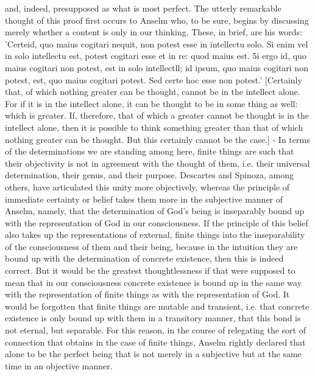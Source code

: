     and, indeed, presupposed as what is most perfect. The utterly
    remarkable thought of this proof first occurs to Anselm who, to be
    sure, begins by discussing merely whether a content is only in our
    thinking. These, in brief, are his words: 'Certeid, quo maius cogitari
    nequit, non potest esse in intellectu solo. Si enim vel in solo
    intellectu est, potest cogitari esse et in re: quod maius est. 5i ergo id,
    quo maius cogitari non potest, est in solo intellectll; id ipsum, quo
    maius cogitari non potest, est, quo maius cogitari potest. Sed certe
    hoc esse non potest.' [Certainly that, of which nothing greater can
    be thought, cannot be in the intellect alone. For if it is in the
    intellect alone, it can be thought to be in some thing as well: which
    is greater. If, therefore, that of which a greater cannot be thought is
    in the intellect alone, then it is possible to think something greater
    than that of which nothing greater can be thought. But this certainly
    cannot be the case.] - In terms of the determinations we are
    standing among here, finite things are such that their objectivity is
    not in agreement with the thought of them, i.e. their universal
    determination, their genus, and their purpose. Descartes and
    Spinoza, among others, have articulated this unity more objectively,
    whereas the principle of immediate certainty or belief takes them
    more in the subjective manner of Anselm, namely, that the
    determination of God's being is inseparably bound up with the
    representation of God in our consciousness. If the principle of this
    belief also takes up the representations of external, finite
    things into the inseparability of the consciousness of them and
    their being, because in the intuition they are bound up with the
    determination of concrete existence, then this is indeed correct. But
    it would be the greatest thoughtlessness if that were supposed to
    mean that in our consciousness concrete existence is bound up in
    the same way with the representation of finite things as with the
    representation of God. It would be forgotten that finite things are
    mutable and transient, i.e. that concrete existence is only bound up
    with them in a transitory manner, that this bond is not eternal, but
    separable. For this reason, in the course of relegating the sort of
    connection that obtains in the case of finite things,
    Anselm rightly declared that alone to be the perfect being that is not
    merely in a subjective but at the same time in an objective manner.

